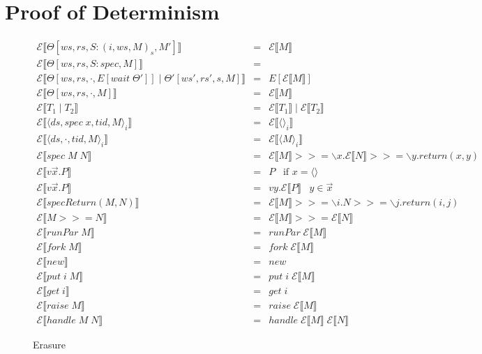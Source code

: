 \documentclass[9pt]{article}
\newcommand{\eval}[1]{E[#1]}
\newcommand{\eraseHelper}[1]{\mathcal{E}\llbracket #1 \rrbracket}
\begin{document}
\section{Proof of Determinism}



\begin{figure}[H]
\centering

\begin{displaymath}
\begin{array}{rcll}

\eraseHelper{\Theta[ws, rs, S : (i, ws, M)_s, M']} &=& \eraseHelper{M} \\
\eraseHelper{\Theta[ws, rs, S : spec, M]} &=& \\
\eraseHelper{\Theta[ws, rs, \cdot, \eval{wait \; \Theta'}] \; | \; \Theta'[ws', rs', s, M]} &=& \eval{\eraseHelper{M}} \\
\eraseHelper{\Theta[ws, rs, \cdot, M]} &=& \eraseHelper{M} \\
\eraseHelper{T_1 \; | \; T_2} &=& \eraseHelper{T_1} \; | \; \eraseHelper{T_2} \\
\eraseHelper{ \langle ds, spec \; x, tid, M\rangle_i} &=& \eraseHelper{ \langle \rangle_i} \\
\eraseHelper{ \langle ds, \cdot, tid, M \rangle_i} &=& \eraseHelper{\langle M \rangle_i}\\
\eraseHelper{ spec \; M \; N} &=& \eraseHelper{M} >>= \backslash x . \eraseHelper{N} >>= \backslash y. return(x, y) \\
\eraseHelper{v\vec{x}.P} &=& P \;\;\; \text{if } x = \langle\rangle \\
\eraseHelper{v\vec{x}.P} &=& vy.\eraseHelper{P} \;\;\; y \in \vec{x} \\
\eraseHelper{specReturn(M, N)} &=& \eraseHelper{M} >>= \backslash i. N >>= \backslash j. return(i, j) \\
\eraseHelper{M >>= N} &=& \eraseHelper{M} >>= \eraseHelper{N}\\
\eraseHelper{runPar \; M} &=& runPar \; \eraseHelper{M} \\
\eraseHelper{fork \; M} &=& fork \; \eraseHelper{M} \\
\eraseHelper{new} &=& new \\
\eraseHelper{put \; i \; M} &=& put \; i \; \eraseHelper{M} \\
\eraseHelper{get \; i} &=& get \; i \\
\eraseHelper{raise \; M} &=& raise \; \eraseHelper{M} \\
\eraseHelper{handle \; M \; N} &=& handle \; \eraseHelper{M} \; \eraseHelper{N} 
\end{array}
\end{displaymath}
\caption{Erasure}
\end{figure}
\end{document}
